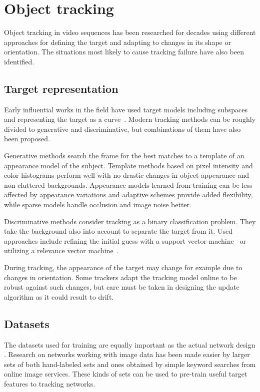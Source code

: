 \section{Object tracking}
Object tracking in video sequences has been researched for decades using different
approaches for defining the target and adapting to changes in its shape or orientation.
The situations most likely to cause tracking failure have also been identified.


\subsection{Target representation}
Early influential works in the field have used target models including subspaces
~\cite{EIGENTRACK} and representing the target as a curve~\cite{CONDENSATION}. Modern
tracking methods can be roughly divided to generative and discriminative, but combinations
of them have also been proposed. 

Generative methods search the frame for the best matches to a template of an appearance
model of the subject. Template methods based on pixel intensity and color histograms
perform well with no drastic changes in object appearance and non-cluttered backgrounds.
Appearance models learned from training can be less affected by appearance variations
and adaptive schemes provide added flexibility, while sparse models handle occlusion
and image noise better.~\cite{OBJECT_PLS}

Discriminative methods consider tracking as a binary classification problem. They take
the background also into account to separate the target from it. Used approaches
include refining the initial guess with a support vector machine~\cite{SVT} or utilizing
a relevance vector machine~\cite{SPARSE_BAYESIAN}.

During tracking, the appearance of the target may change for example due to changes in
orientation. Some trackers adapt the tracking model online to be robust against such
changes, but care must be taken in designing the update algorithm as it could result
to drift.

\subsection{Datasets}
The datasets used for training are equally important as the actual network design
.
Research on networks working with image data has been made easier by larger sets of both
hand-labeled sets and ones obtained by simple keyword searches from online image services.
These kinds of sets can be used to pre-train useful target features to tracking networks.

